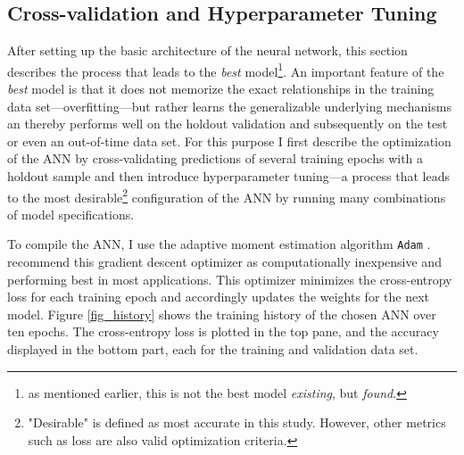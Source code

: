 \documentclass[12pt,a4paper]{article}
\let\code=\texttt
\begin{document}
\subsection{Cross-validation and Hyperparameter Tuning} \label{sec_crossval}
After setting up the basic architecture of the neural network, this section describes the process that leads to the \textit{best} model\footnote{as mentioned earlier, this is not the best model \textit{existing}, but \textit{found}.}.
An important feature of the \textit{best} model is that it does not memorize the exact relationships in the training data set---overfitting---but
rather learns the generalizable underlying mechanisms an thereby performs well on the holdout validation and subsequently on the test or even an out-of-time data set. 
For this purpose I first describe the optimization of the ANN by cross-validating predictions of several training epochs with a holdout 
sample and then introduce hyperparameter tuning---a process that leads to the most desirable\footnote{"Desirable" is defined as most accurate in this study. However, other metrics such as loss are also valid optimization criteria.} configuration of the ANN by
running many combinations of model specifications.

To compile the ANN, I use the adaptive moment estimation algorithm \code{Adam} \citep{kingmaAdamMethodStochastic2014}.
\cite{ruderOverviewGradientDescent2016} recommend this gradient descent optimizer as computationally inexpensive and performing best in most applications.
This optimizer minimizes the cross-entropy loss \citep{zhangGeneralizedCrossEntropy2018} for each training epoch and accordingly updates the weights
for the next model.
Figure \ref{fig_history} shows the training history of the chosen ANN over ten epochs. The cross-entropy loss is plotted in the top pane, and the accuracy
displayed in the bottom part, each for the training and validation data set.
\end{document}

